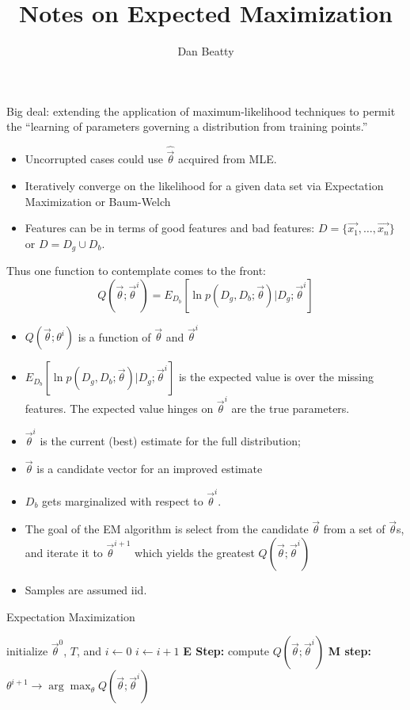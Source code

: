 \documentclass[11pt]{article}
\title{Notes on Expected Maximization}
\author{Dan Beatty}
\begin{document}
\maketitle

Big deal: extending the application of maximum-likelihood techniques to permit the ``learning of parameters governing a distribution from training points.''
\begin{itemize}
	\item Uncorrupted cases could use $\hat{\vec{\theta}}$ acquired from MLE.
	\item Iteratively converge on the likelihood for a given data set via Expectation Maximization or Baum-Welch
	\item Features can be in terms of good features and bad features:  $D = \{ \vec{x_1} ,\ldots,\vec{x_n} \}$ or $D = D_g \cup D_b$.
\end{itemize}

Thus one function to contemplate comes to the front:
\begin{equation}
Q( \vec{\theta} ; \vec{\theta}^i) = E_{D_b} [ \ln p(D_g, D_b; \vec{\theta}) | D_g ; \vec{\theta}^i ] 
\end{equation}
\begin{itemize}
	\item $Q(\vec{\theta} ; \theta^i)$ is a function of $\vec{\theta}$ and $\vec{\theta}^i$
	\item $E_{D_b} [ \ln p(D_g, D_b; \vec{\theta}) | D_g ; \vec{\theta}^i ] $ is the expected value is over the missing features.  The expected value hinges on $\vec{\theta}^i$ are the true parameters.
	\item $\vec{\theta}^i$ is the current (best) estimate for the full distribution;  
	\item $\vec{\theta}$ is a candidate vector for an improved estimate 
	\item $D_b$ gets marginalized with respect to $\vec{\theta}^i$.
	\item The goal of the EM algorithm is select from the candidate $\vec{\theta}$ from a set of $\vec{\theta}$s, and iterate it to $\vec{\theta}^{i+1}$ which yields the greatest $Q(\vec{\theta} ; \vec{\theta}^i)$
	\item Samples are assumed iid.  
\end{itemize}

\begin{algorithm}
\caption{Expectation Maximization}
\label{alg:expectation-maximization}
\begin{algorithmic}
	\STATE initialize $\vec{\theta}^0$, $T$, and $i \leftarrow 0$
	\REPEAT
		\STATE $i \leftarrow i + 1$
		\STATE \textbf{E Step:} compute $Q(\vec{\theta} ; \vec{\theta}^i)$ 
		\STATE \textbf{M step:} $\theta ^{i+1} \rightarrow \arg \max _{\theta} Q(\vec{\theta} ; \vec{\theta} ^i)$ 
\end{algorithmic}
\end{algorithm}
\end{document}
